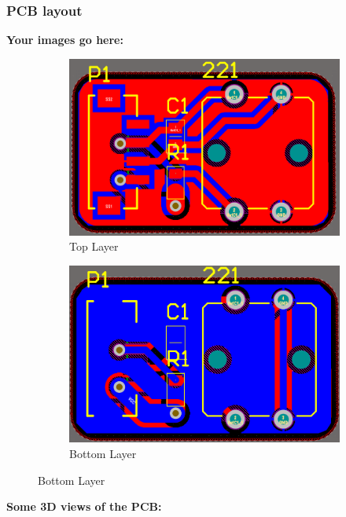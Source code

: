 \subsubsection{PCB layout}
\textbf{Your images go here:}
\begin{figure}[h!]
    \centering
    \begin{subfigure}{0.495\textwidth}
        \centering
        \includegraphics[width=\textwidth]{graphics/ex4/f2.png}
        \caption*{Top Layer}
    \end{subfigure}
    \hfill
    \begin{subfigure}{0.495\textwidth}
        \centering
        \includegraphics[width=\textwidth]{graphics/ex4/f3.png}
        \caption*{Bottom Layer}
    \end{subfigure}
\end{figure}
\newpage
\textbf{Some 3D views of the PCB:}
